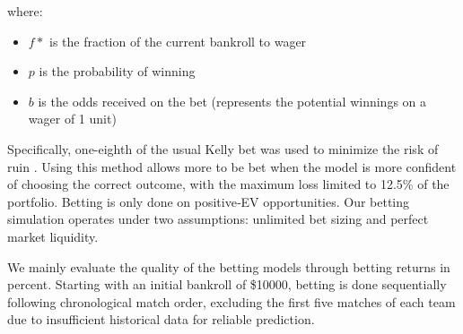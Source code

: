 \documentclass[conference]{IEEEtran}
\begin{document}
\noindent where:
\begin{itemize}
\item   $f *$ is the fraction of the current bankroll to wager
\item $p$ is the probability of winning
\item $b$ is the odds received on the bet (represents the potential winnings on a wager of 1 unit)
\end{itemize}
Specifically, one-eighth of the usual Kelly bet was used to minimize the risk of ruin \cite{hsieh2015kelly}. Using this method allows more to be bet when the model is more confident of choosing the correct outcome, with the maximum loss limited to 12.5\% of the portfolio. Betting is only done on positive‑EV opportunities. Our betting simulation operates under two assumptions: unlimited bet sizing and perfect market liquidity.



We mainly evaluate the quality of the betting models through betting returns in percent. Starting with an initial bankroll of \$10000, betting is done sequentially following chronological match order, excluding the first five matches of each team due to insufficient historical data for reliable prediction. %
\end{document}
